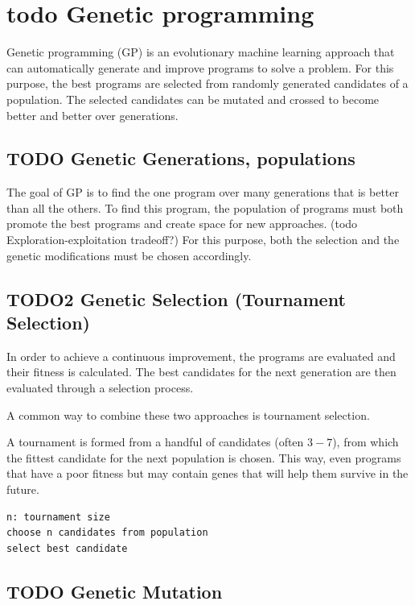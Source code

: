 
\section{todo Genetic programming}

Genetic programming (GP) is an evolutionary machine learning approach that can automatically generate and improve programs to solve a problem.
For this purpose, the best programs are selected from randomly generated candidates of a population. The selected candidates can be mutated and crossed to become better and better over generations.

\subsection{TODO Genetic Generations, populations}

The goal of GP is to find the one program over many generations that is better than all the others. To find this program, the population of programs must both promote the best programs and create space for new approaches. (todo Exploration-exploitation tradeoff?) For this purpose, both the selection and the genetic modifications must be chosen accordingly.

\subsection{TODO2 Genetic Selection (Tournament Selection)}
    
In order to achieve a continuous improvement, the programs are evaluated and their fitness is calculated. The best candidates for the next generation are then evaluated through a selection process.

A common way to combine these two approaches is tournament selection. 

A tournament is formed from a handful of candidates (often $3-7$), from which the fittest candidate for the next population is chosen.
This way, even programs that have a poor fitness but may contain genes that will help them survive in the future.

\begin{lstlisting}
n: tournament size
choose n candidates from population
select best candidate
\end{lstlisting}

\subsection{TODO Genetic Mutation}
    
